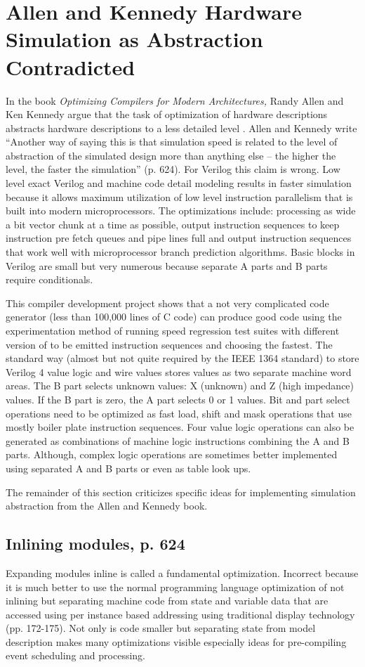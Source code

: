 \documentclass[preprint, authoryear]{sigplanconf}
\begin{document}
\section{Allen and Kennedy Hardware Simulation as Abstraction Contradicted}
\par
In the book \textit{Optimizing Compilers for Modern Architectures,}
Randy Allen and Ken Kennedy argue that the task of optimization of
hardware descriptions abstracts
hardware descriptions to a less detailed level \cite{Allen2002}.
Allen and Kennedy write ``Another way of saying this is that simulation
speed is related to the level of abstraction of the simulated design more
than anything else -- the higher the level, the faster the simulation''
(p. 624). For Verilog this claim is wrong.  Low level exact Verilog
and machine code detail modeling results
in faster simulation because it allows maximum utilization of low level
instruction parallelism that is built into modern microprocessors. 
The optimizations include:  processing
as wide a bit vector chunk at a time as possible, 
output instruction sequences to keep instruction pre fetch
queues and pipe lines
full and output instruction sequences that work well with 
microprocessor branch prediction algorithms.
Basic blocks in Verilog are small but very numerous because separate
A parts and B parts require conditionals.
\par
This compiler development project shows that a not very complicated code
generator (less than 100,000 lines of C code) can produce good code
using the experimentation method of running speed regression test suites with
different version of to be emitted instruction sequences and choosing the
fastest.
The standard way
(almost but not quite required by the IEEE 1364 standard) to store
Verilog 4 value logic and wire values stores values as two separate
machine word areas.  The B part selects unknown
values: X (unknown) and Z (high
impedance) values.  If the B part is zero, the A part selects 0 or 1
values.  Bit and part select operations need to be optimized as 
fast load, shift and mask operations that use mostly boiler plate
instruction sequences.
Four value logic operations can also
be generated as combinations of machine logic instructions combining
the A and B parts.  Although, complex logic operations are sometimes better
implemented using separated A and B parts or even as table look ups.
\par
The remainder of this section criticizes specific ideas for
implementing simulation abstraction from the Allen and Kennedy book.
\subsection{Inlining modules, p. 624}
\par
Expanding modules inline is called a fundamental optimization.
Incorrect because it is much better to use the normal programming language
optimization of not inlining but separating machine code from state
and variable data that are accessed using per instance based addressing
using traditional display technology \cite{Gries1971} (pp. 172-175).
Not only is code smaller but separating state from model description
makes many optimizations visible especially ideas for pre-compiling
event scheduling and processing.
\end{document}
